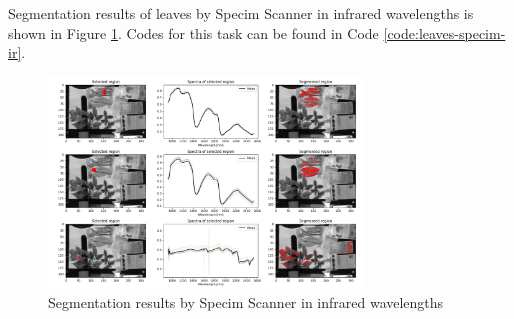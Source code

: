 Segmentation results of leaves by Specim Scanner in infrared
wavelengths is shown in Figure \ref{fig:leaves-specim-ir}.
Codes for this task can be found in Code \ref{code:leaves-specim-ir}.
\begin{figure}[H]
  \centering
  \caption{Segmentation results by Specim Scanner in infrared wavelengths}
  \label{fig:leaves-specim-ir}
  \includegraphics[width=0.75\textwidth]{./fig/task2/specim-scanner-ir.png}
\end{figure}
